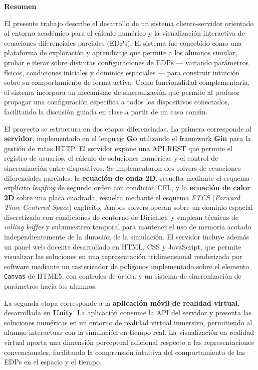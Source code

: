 \documentclass[12pt, a4paper]{article}
\begin{document}
\begin{center}
    {\large\bfseries Resumen}
\end{center}

\vspace{0.6cm}

El presente trabajo describe el desarrollo de un sistema cliente-servidor orientado al
entorno académico para el cálculo numérico y la visualización interactiva de ecuaciones
diferenciales parciales (EDPs). El sistema fue concebido como una plataforma de
exploración y aprendizaje que permite a los alumnos simular, probar e iterar sobre
distintas configuraciones de EDPs — variando parámetros físicos, condiciones iniciales
y dominios espaciales — para construir intuición sobre su comportamiento de forma
activa. Como funcionalidad complementaria, el sistema incorpora un mecanismo de
sincronización que permite al profesor propagar una configuración específica a todos
los dispositivos conectados, facilitando la discusión guiada en clase a partir de un
caso común.

El proyecto se estructura en dos etapas diferenciadas. La primera corresponde al
\textbf{servidor}, implementado en el lenguaje \textbf{Go} utilizando el framework
\textbf{Gin} para la gestión de rutas HTTP. El servidor expone una API REST que permite
el registro de usuarios, el cálculo de soluciones numéricas y el control de
sincronización entre dispositivos. Se implementaron dos solvers de ecuaciones
diferenciales parciales: la \textbf{ecuación de onda 2D}, resuelta mediante el esquema
explícito \textit{leapfrog} de segundo orden con condición CFL, y la
\textbf{ecuación de calor 2D} sobre una placa cuadrada, resuelta mediante el esquema
\textit{FTCS} (\textit{Forward Time Centered Space}) explícito. Ambos solvers operan
sobre un dominio espacial discretizado con condiciones de contorno de Dirichlet, y
emplean técnicas de \textit{rolling buffer} y submuestreo temporal para mantener el
uso de memoria acotado independientemente de la duración de la simulación. El servidor
incluye además un panel web docente desarrollado en HTML, CSS y JavaScript, que permite
visualizar las soluciones en una representación tridimensional renderizada por software
mediante un rasterizador de polígonos implementado sobre el elemento \texttt{Canvas} de
HTML5, con controles de órbita y un sistema de sincronización de parámetros hacia los
alumnos.

La segunda etapa corresponde a la \textbf{aplicación móvil de realidad virtual},
desarrollada en \textbf{Unity}. La aplicación consume la API del servidor y presenta
las soluciones numéricas en un entorno de realidad virtual inmersivo, permitiendo al
alumno interactuar con la simulación en tiempo real. La visualización en realidad
virtual aporta una dimensión perceptual adicional respecto a las representaciones
convencionales, facilitando la comprensión intuitiva del comportamiento de las EDPs en
el espacio y el tiempo.
\end{document}
